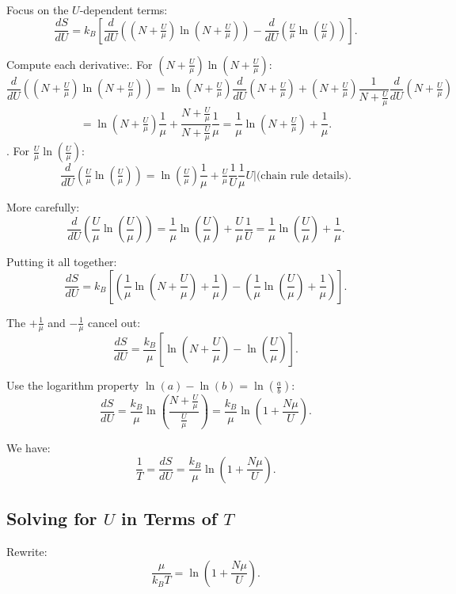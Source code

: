 \documentclass{article}
\begin{document}
Focus on the $U$-dependent terms:
\[
\frac{dS}{dU} = k_B \left[ \frac{d}{dU}\left((N + \tfrac{U}{\mu})\ln\left(N + \tfrac{U}{\mu}\right)\right) - \frac{d}{dU}\left(\tfrac{U}{\mu}\ln\left(\tfrac{U}{\mu}\right)\right) \right].
\]

Compute each derivative:. For $(N + \tfrac{U}{\mu})\ln\left(N + \tfrac{U}{\mu}\right)$:
\[
\frac{d}{dU} \left((N + \tfrac{U}{\mu})\ln\left(N + \tfrac{U}{\mu}\right)\right) 
= \ln\left(N + \tfrac{U}{\mu}\right)\frac{d}{dU}(N + \tfrac{U}{\mu}) + (N+\tfrac{U}{\mu}) \frac{1}{N+\tfrac{U}{\mu}}\frac{d}{dU}(N+\tfrac{U}{\mu})
\]
\[
= \ln\left(N + \tfrac{U}{\mu}\right)\frac{1}{\mu} + \frac{N+\tfrac{U}{\mu}}{N+\tfrac{U}{\mu}}\frac{1}{\mu}
= \frac{1}{\mu}\ln\left(N + \tfrac{U}{\mu}\right) + \frac{1}{\mu}.
\]
. For $\tfrac{U}{\mu}\ln\left(\tfrac{U}{\mu}\right)$:
\[
\frac{d}{dU}\left(\tfrac{U}{\mu}\ln\left(\tfrac{U}{\mu}\right)\right) 
= \ln\left(\tfrac{U}{\mu}\right)\frac{1}{\mu} + \tfrac{U}{\mu}\frac{1}{U}\frac{1}{\mu}U\biggr| \text{(chain rule details)}.
\]

More carefully:
\[
\frac{d}{dU}\left(\frac{U}{\mu}\ln\left(\frac{U}{\mu}\right)\right) 
= \frac{1}{\mu}\ln\left(\frac{U}{\mu}\right) + \frac{U}{\mu}\frac{1}{U}
= \frac{1}{\mu}\ln\left(\frac{U}{\mu}\right) + \frac{1}{\mu}.
\]

Putting it all together:
\[
\frac{dS}{dU} = k_B\left[\left(\frac{1}{\mu}\ln\left(N + \frac{U}{\mu}\right) + \frac{1}{\mu}\right) - \left(\frac{1}{\mu}\ln\left(\frac{U}{\mu}\right) + \frac{1}{\mu}\right)\right].
\]

The $+\frac{1}{\mu}$ and $-\frac{1}{\mu}$ cancel out:
\[
\frac{dS}{dU} = \frac{k_B}{\mu}\left[\ln\left(N + \frac{U}{\mu}\right) - \ln\left(\frac{U}{\mu}\right)\right].
\]

Use the logarithm property $\ln(a) - \ln(b) = \ln\left(\frac{a}{b}\right)$:
\[
\frac{dS}{dU} = \frac{k_B}{\mu}\ln\left(\frac{N + \frac{U}{\mu}}{\frac{U}{\mu}}\right) = \frac{k_B}{\mu}\ln\left(1 + \frac{N\mu}{U}\right).
\]

We have:
\[
\frac{1}{T} = \frac{dS}{dU} = \frac{k_B}{\mu}\ln\left(1 + \frac{N\mu}{U}\right).
\]

\subsection*{Solving for $U$ in Terms of $T$}

Rewrite:
\[
\frac{\mu}{k_B T} = \ln\left(1 + \frac{N\mu}{U}\right).
\]
\end{document}
